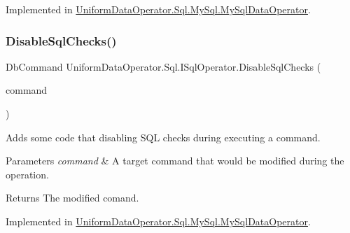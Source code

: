Implemented in \mbox{\hyperlink{class_uniform_data_operator_1_1_sql_1_1_my_sql_1_1_my_sql_data_operator_a7b854ebbcdf31c67716d8c365c321a31}{Uniform\+Data\+Operator.\+Sql.\+My\+Sql.\+My\+Sql\+Data\+Operator}}.

\mbox{\label{interface_uniform_data_operator_1_1_sql_1_1_i_sql_operator_a12d464e0532a3e194b1221eee0c32d34}} 
\subsubsection{\texorpdfstring{Disable\+Sql\+Checks()}{DisableSqlChecks()}\hspace{0.1cm}{\footnotesize\ttfamily [1/2]}}
{\footnotesize\ttfamily Db\+Command Uniform\+Data\+Operator.\+Sql.\+I\+Sql\+Operator.\+Disable\+Sql\+Checks (\begin{DoxyParamCaption}\item[{Db\+Command}]{command }\end{DoxyParamCaption})}



Adds some code that disabling S\+QL checks during executing a command. 


\begin{DoxyParams}{Parameters}
{\em command} & A target command that would be modified during the operation. \\
\hline
\end{DoxyParams}
\begin{DoxyReturn}{Returns}
The modified comand. 
\end{DoxyReturn}


Implemented in \mbox{\hyperlink{class_uniform_data_operator_1_1_sql_1_1_my_sql_1_1_my_sql_data_operator_affbacb4fb1773fc14cdbb9cbcd315c5f}{Uniform\+Data\+Operator.\+Sql.\+My\+Sql.\+My\+Sql\+Data\+Operator}}.

\mbox{\label{interface_uniform_data_operator_1_1_sql_1_1_i_sql_operator_a0757f304a24ffaa743e23e8bdd210950}} 

